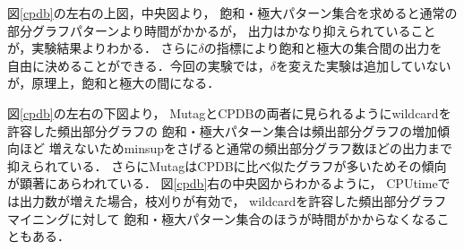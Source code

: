 図\ref{cpdb}の左右の上図，中央図より，
飽和・極大パターン集合を求めると通常の部分グラフパターンより時間がかかるが，
出力はかなり抑えられていることが，実験結果よりわかる．
さらに$\delta$の指標により飽和と極大の集合間の出力を
自由に決めることができる．今回の実験では，$\delta$を変えた実験は追加していない
が，原理上，飽和と極大の間になる．

図\ref{cpdb}の左右の下図より，
MutagとCPDBの両者に見られるようにwildcardを許容した頻出部分グラフの
飽和・極大パターン集合は頻出部分グラフの増加傾向ほど
増えないためminsupをさげると通常の頻出部分グラフ数ほどの出力まで抑えられている．
さらにMutagはCPDBに比べ似たグラフが多いためその傾向が顕著にあらわれている．
図\ref{cpdb}右の中央図からわかるように，
CPUtimeでは出力数が増えた場合，枝刈りが有効で，
wildcardを許容した頻出部分グラフマイニングに対して
飽和・極大パターン集合のほうが時間がかからなくなることもある．

